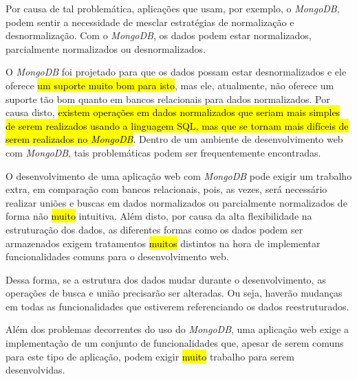 

Por causa de tal problemática, aplicações que usam, por exemplo, o \textit{MongoDB}, podem sentir a necessidade de mesclar estratégias de normalização e desnormalização. Com o \textit{MongoDB}, os dados podem estar normalizados, parcialmente normalizados ou desnormalizados.

O \textit{MongoDB} foi projetado para que os dados possam estar desnormalizados e ele oferece \hl{um suporte muito bom para isto}, mas ele, atualmente, não oferece um suporte tão bom quanto em bancos relacionais para dados normalizados. Por causa disto, \hl{existem operações em dados normalizados que seriam mais simples de serem realizados usando a linguagem SQL, mas que se tornam mais difíceis de serem realizados no \textit{MongoDB}}. Dentro de um ambiente de desenvolvimento web com \textit{MongoDB}, tais problemáticas podem ser frequentemente encontradas.



O desenvolvimento de uma aplicação web com \textit{MongoDB} pode exigir um trabalho extra, em comparação com bancos relacionais, pois, as vezes, será necessário realizar uniões e buscas em dados normalizados ou parcialmente normalizados de forma não \hl{muito} intuitiva. Além disto, por causa da alta flexibilidade na estruturação dos dados, as diferentes formas como os dados podem ser armazenados exigem tratamentos \hl{muitos} distintos na hora de implementar funcionalidades comuns para o desenvolvimento web.

Dessa forma, se a estrutura dos dados mudar durante o desenvolvimento, as operações de busca e união precisarão ser alteradas. Ou seja, haverão mudanças em todas as funcionalidades que estiverem referenciando os dados reestruturados.

Além dos problemas decorrentes do uso do \textit{MongoDB}, uma aplicação web exige a implementação de um conjunto de funcionalidades que, apesar de serem comuns para este tipo de aplicação, podem exigir \hl{muito} trabalho para serem desenvolvidas.

